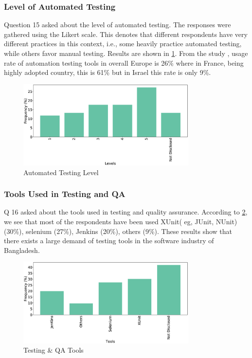 \subsubsection{Level of Automated Testing}
Question 15 asked about the level of automated testing. The responses were gathered using the Likert scale. This denotes that different respondents have very different practices in this context, i.e., some heavily practice automated testing, while others favor manual testing. Results are shown in \ref{fig:autoTest}. From the study \cite{dutta1999}, usage rate of automation testing tools in overall Europe is 26\% where in France, being highly adopted country, this is 61\% but in Israel this rate is only 9\%.
\begin{figure}[htbp]
\centering
  \includegraphics[width=0.8\textwidth]{Figures/Respondents_autotest_level}
  \caption{Automated Testing Level}
  \label{fig:autoTest}
\end{figure}

\subsubsection{Tools Used in Testing and QA}
Q 16 asked about the tools used in testing and quality assurance. According to \ref{fig:testingTools}, we see that most of the respondents have been used XUnit( eg, JUnit, NUnit) (30\%), selenium (27\%), Jenkins (20\%), others (9\%). These results show that there exists a large demand of testing tools in the software industry of Bangladesh.

\begin{figure}[htbp]
\centering
  \includegraphics[width=0.8\textwidth]{Figures/Respondents_testing_tools}
  \caption{Testing \& QA Tools}
  \label{fig:testingTools}
\end{figure}

